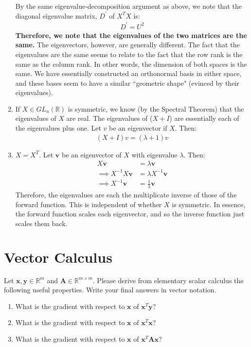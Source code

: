 \documentclass[submit]{harvardml}
\newcommand{\R}{\mathbb{R}}
\renewcommand{\v}[1]{\mathbf{#1}}
\begin{document}
\begin{enumerate}[label=(\alph*)]
By the same eigenvalue-decomposition argument as above, we note that the diagonal eigenvalue matrix, $D^{'}$ of $X^T X$ is:
	\begin{align}
		D^{'} = U^2
	\end{align}
\textbf{Therefore, we note that the eigenvalues of the two matrices are the same.} The eigenvectors, however, are generally different. The fact that the eigenvalues are the same seems to relate to the fact that the row rank is the same as the column rank. In other words, the dimension of both spaces is the same. We have essentially constructed an orthonormal basis in either space, and these bases seem to have a similar ``geometric shape" (evinced by their eigenvalues).

	\item If $X \in GL_n(\mathbb{R})$ is symmetric, we know (by the Spectral Theorem) that the eigenvalues of $X$ are real. The eigenvalues of ($X + I$) are essentially each of the eigenvalues plus one. Let $v$ be an eigenvector if $X$. Then:
		\begin{align}
			(X + I) v = (\lambda + 1) v
		\end{align}
	
	\item $X = X^T$. Let $\v{v}$ be an eigenvector of $X$ with eigenvalue $\lambda$. Then:
		\begin{align}
			X \v{v} &= \lambda \v {v}\\
			\implies X^{-1} X \v{v} &= \lambda X^{-1} \v{v} \\
			\implies X^{-1} \v{v} &= \frac{1}{\lambda} \v{v}
		\end{align}
		Therefore, the eigenvalues are each the multiplicate inverse of those of the forward function. This is independent of whether $X$ is symmetric. In essence, the forward function scales each eigenvector, and so the inverse function just scales them back.
\end{enumerate}
\newpage
\section*{Vector Calculus}
\begin{problem}
  Let $\v x, \v y \in \R^m$ and $\v A \in \R^{m \times m}$. Please derive from
  elementary scalar calculus the following useful properties. Write
  your final answers in vector notation.
\begin{enumerate}[label=(\alph*)]
    \item What is the gradient with respect to $\v x$ of $\v x^T \v y$?
    \item What is the gradient with respect to $\v x$ of $\v x^T \v x$?
    \item What is the gradient with respect to $\v x$ of $\v x^T \v A \v x$?
\end{enumerate}
\end{problem}
\end{document}
